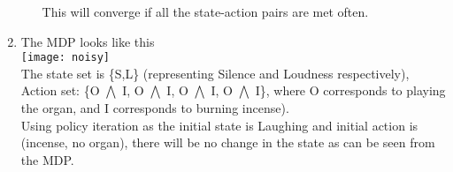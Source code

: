 \documentclass[english]{article}
\begin{document}
\begin{enumerate}
\begin{enumerate}
This will converge if all the state-action pairs are met often.
\end{enumerate}
\item The MDP looks like this\\
\texttt{[image: noisy]}\\
The state set is \{S,L\} (representing Silence and Loudness respectively),
Action set: \{O \ensuremath{\bigwedge} I, O \ensuremath{\bigwedge}
\textlnot I, \textlnot O \ensuremath{\bigwedge} I, \textlnot O \ensuremath{\bigwedge}
\textlnot I\}, where O corresponds to playing the organ, and I corresponds
to burning incense).\\
Using policy iteration as the initial state is Laughing and initial
action is (incense, no organ), there will be no change in the state
as can be seen from the MDP.
\end{enumerate}
\end{document}
